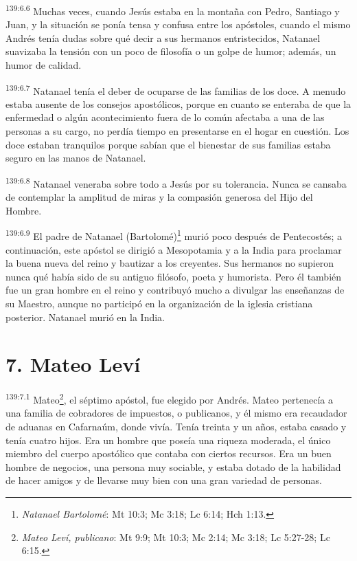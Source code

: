 \par 
\textsuperscript{139:6.6} Muchas veces, cuando Jesús estaba en la montaña con Pedro, Santiago y Juan, y la situación se ponía tensa y confusa entre los apóstoles, cuando el mismo Andrés tenía dudas sobre qué decir a sus hermanos entristecidos, Natanael suavizaba la tensión con un poco de filosofía o un golpe de humor; además, un humor de calidad.

\par 
\textsuperscript{139:6.7} Natanael tenía el deber de ocuparse de las familias de los doce. A menudo estaba ausente de los consejos apostólicos, porque en cuanto se enteraba de que la enfermedad o algún acontecimiento fuera de lo común afectaba a una de las personas a su cargo, no perdía tiempo en presentarse en el hogar en cuestión. Los doce estaban tranquilos porque sabían que el bienestar de sus familias estaba seguro en las manos de Natanael.

\par 
\textsuperscript{139:6.8} Natanael veneraba sobre todo a Jesús por su tolerancia. Nunca se cansaba de contemplar la amplitud de miras y la compasión generosa del Hijo del Hombre.

\par 
\textsuperscript{139:6.9} El padre de Natanael (Bartolomé)\footnote{\textit{Natanael Bartolomé}: Mt 10:3; Mc 3:18; Lc 6:14; Hch 1:13.} murió poco después de Pentecostés; a continuación, este apóstol se dirigió a Mesopotamia y a la India para proclamar la buena nueva del reino y bautizar a los creyentes. Sus hermanos no supieron nunca qué había sido de su antiguo filósofo, poeta y humorista. Pero él también fue un gran hombre en el reino y contribuyó mucho a divulgar las enseñanzas de su Maestro, aunque no participó en la organización de la iglesia cristiana posterior. Natanael murió en la India.

\section*{7. Mateo Leví}
\par 
\textsuperscript{139:7.1} Mateo\footnote{\textit{Mateo Leví, publicano}: Mt 9:9; Mt 10:3; Mc 2:14; Mc 3:18; Lc 5:27-28; Lc 6:15.}, el séptimo apóstol, fue elegido por Andrés. Mateo pertenecía a una familia de cobradores de impuestos, o publicanos, y él mismo era recaudador de aduanas en Cafarnaúm, donde vivía. Tenía treinta y un años, estaba casado y tenía cuatro hijos. Era un hombre que poseía una riqueza moderada, el único miembro del cuerpo apostólico que contaba con ciertos recursos. Era un buen hombre de negocios, una persona muy sociable, y estaba dotado de la habilidad de hacer amigos y de llevarse muy bien con una gran variedad de personas.

